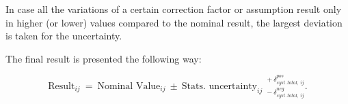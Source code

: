 In case all the variations of a certain correction factor or assumption result only in higher (or lower) values 
compared to the nominal result, the largest deviation is taken for the uncertainty.

The final result is presented the following way:

\begin{equation}
 \textrm{Result}_{ij}\: = \: \textrm{Nominal Value}_{ij}\: \pm \: \textrm{Stats. uncertainty}_{ij}\:\: { }^{+\:\delta_{syst.\,total,\:ij}^{pos}}_{-\:\delta_{syst.\,total,\:ij}^{neg}}.
\end{equation}


